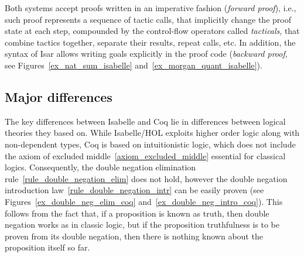 \documentclass[article]{aaltoseries}
\begin{document}
Both systems accept proofs written in an imperative fashion (\textit{forward proof}), i.e., such proof represents a sequence of tactic calls, that implicitly change the proof state at each step, compounded by the control-flow operators called \textit{tacticals}, that combine tactics together, separate their results, repeat calls, etc. In addition, the syntax of Isar allows writing goals explicitly in the proof code (\textit{backward proof}, see Figures~\ref{ex_nat_sum_isabelle} and~\ref{ex_morgan_quant_isabelle}).




\subsection{Major differences}

The key differences between Isabelle and Coq lie in differences between logical theories they based on. While Isabelle/HOL exploits higher order logic along with non-dependent types, Coq is based on intuitionistic logic, which does not include the axiom of excluded middle~\eqref{axiom_excluded_middle} essential for classical logics.
Consequently, the double negation elimination rule~\eqref{rule_double_negation_elim} does not hold, however the double negation introduction law~\eqref{rule_double_negation_intr} can be easily proven (see Figures~\ref{ex_double_neg_elim_coq} and~\ref{ex_double_neg_intro_coq}). This follows from the fact that, if a proposition is known as truth, then double negation works as in classic logic, but if the proposition truthfulness is to be proven from its double negation, then there is nothing known about the proposition itself so far.
\end{document}
